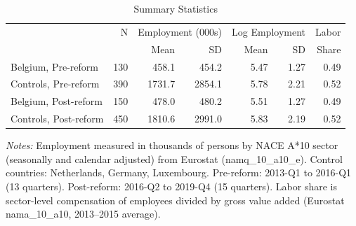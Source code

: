 \begin{table}[H]
\centering
\caption{Summary Statistics}
\begin{threeparttable}
\begin{tabular}{lrrrrrr}
\toprule
 & N & \multicolumn{2}{c}{Employment (000s)} & \multicolumn{2}{c}{Log Employment} & Labor \\
 & & Mean & SD & Mean & SD & Share \\
\midrule
Belgium, Pre-reform & 130 & 458.1 & 454.2 & 5.47 & 1.27 & 0.49 \\
Controls, Pre-reform & 390 & 1731.7 & 2854.1 & 5.78 & 2.21 & 0.52 \\
Belgium, Post-reform & 150 & 478.0 & 480.2 & 5.51 & 1.27 & 0.49 \\
Controls, Post-reform & 450 & 1810.6 & 2991.0 & 5.83 & 2.19 & 0.52 \\
\bottomrule
\end{tabular}
\begin{tablenotes}[flushleft]
\small
\item \textit{Notes:} Employment measured in thousands of persons by NACE A*10 sector (seasonally and calendar adjusted) from Eurostat (namq\_10\_a10\_e). Control countries: Netherlands, Germany, Luxembourg. Pre-reform: 2013-Q1 to 2016-Q1 (13 quarters). Post-reform: 2016-Q2 to 2019-Q4 (15 quarters). Labor share is sector-level compensation of employees divided by gross value added (Eurostat nama\_10\_a10, 2013--2015 average).
\end{tablenotes}
\end{threeparttable}
\label{tab:summary}
\end{table}
